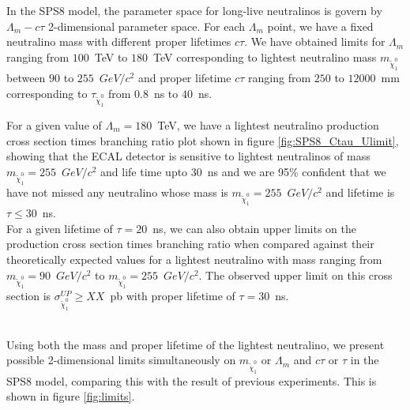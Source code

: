 In the SPS8 model, the parameter space for long-live neutralinos is govern by $\Lambda_{m}-c\tau$ 2-dimensional parameter space. For each $\Lambda_{m}$ point, we have a fixed neutralino mass with different proper lifetimes $c\tau$. We have obtained limits for $\Lambda_{m}$ ranging from $100$~TeV to $180$~TeV corresponding to lightest neutralino mass $m_{\tilde{\chi}^{0}_{1}}$ between $90$ to $255$~$GeV/c^{2}$ and proper lifetime $c\tau$ ranging from $250$ to $12000$~mm corresponding to $\tau_{\tilde{\chi}^{0}_{1}}$ from $0.8$~ns to $40$~ns.

For a given value of $\Lambda_{m} = 180$~TeV, we have a lightest neutralino production cross section times branching ratio plot shown in figure \ref{fig:SPS8_Ctau_Ulimit}, showing that the ECAL detector is sensitive to lightest neutralinos of mass $m_{\tilde{\chi}^{0}_{1}} = 255$~$GeV/c^{2}$ and life time upto $30$~ns and we are 95\% confident that we have not missed any neutralino whose mass is $m_{\tilde{\chi}^{0}_{1}} = 255$~$GeV/c^{2}$ and lifetime is $\tau \leq 30$~ns.
\mbox{}\\
For a given lifetime of $\tau = 20$~ns, we can also obtain upper limits on the production cross section times branching ratio when compared against their theoretically expected values for a lightest neutralino with mass ranging from $m_{\tilde{\chi}^{0}_{1}} = 90$~$GeV/c^{2}$ to $m_{\tilde{\chi}^{0}_{1}} = 255$~$GeV/c^{2}$. The observed upper limit on this cross section is $\sigma^{UP}_{\tilde{\chi}^{0}_{1}} \geq XX$~pb with proper lifetime of $\tau = 30$~ns.

\mbox{}\\
Using both the mass and proper lifetime of the lightest neutralino, we present possible 2-dimensional limits simultaneously on $m_{\tilde{\chi}^{0}_{1}}$ or $\Lambda_{m}$ and $c\tau$ or $\tau$ in the SPS8 model, comparing this with the result of previous experiments. This is shown in figure \ref{fig:limits}.


